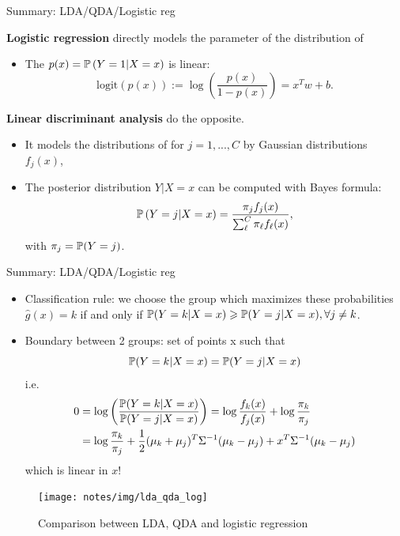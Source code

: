 \documentclass[xcolor={usenames,dvipsnames},handout]{beamer}
\begin{document}
\begin{frame}{Summary: LDA/QDA/Logistic reg}


 \textbf{Logistic regression} directly models the parameter of the distribution of 
 \pause
\begin{itemize}
\item The  $p(x)=\P\left(  Y = 1 | X =x \right)$  is \alert{linear}:
$$
\mathrm{logit} (p(x)) := \log\left( \frac{p(x)}{1-p(x)} \right) = x^T w + b.
$$
\end{itemize}

\textbf{Linear discriminant analysis} do the opposite. 
\pause
\begin{itemize}
\item It models the distributions of  for $j = 1,...,C$ by Gaussian distributions $f_j(x)$,
\item  The posterior distribution $Y|X = x$ can be computed with Bayes formula:
$$
\P \left( Y =j | X=x \right) = \frac{\pi_j f_j(x) }{\sum_\ell^C \pi_\ell f_\ell(x)},
$$
with $\pi_j = \P(Y=j)$.
\end{itemize}

\end{frame}

\begin{frame}{Summary: LDA/QDA/Logistic reg}

\begin{itemize}
\item Classification rule: we choose the group which maximizes these probabilities
$\hat{g}(x)=k$ if and only if $\P(Y=k|X=x)\geq \P(Y=j|X=x), \forall j \neq k$.
\item Boundary between 2 groups: set of points x such that 
$$\P (Y =k|X =x)=\P(Y =j|X =x)$$
i.e.\
\begin{align*}
0 &= \log\left(\frac{\P (Y =k|X =x)}{\P(Y =j|X =x)} \right) =  \log\frac{f_k(x)}{f_j(x)}+ 	\log\frac{\pi_k}{\pi_j} \\
&= \log\frac{\pi_k}{\pi_j} + \frac{1}{2} (\mu_k + \mu_j)^T \Sigma^{-1} (\mu_k - \mu_j) + x^T \Sigma^{-1} (\mu_k - \mu_j)
\end{align*}
which is \alert{linear} in $x$!
\end{itemize}

\end{frame}

\begin{frame}

\begin{figure}
\begin{center}
\texttt{[image: notes/img/lda\_qda\_log]}
\end{center}
\caption{Comparison between LDA, QDA and logistic regression}
\end{figure}

\end{frame}
\end{document}

